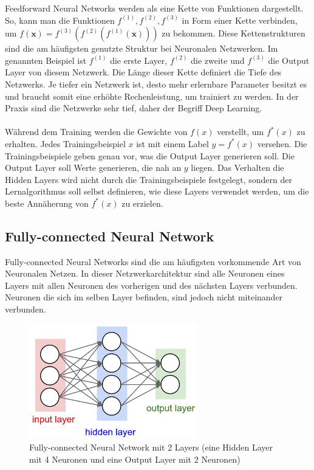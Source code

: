 Feedforward Neural Networks werden als eine Kette von Funktionen dargestellt. So,
kann man die Funktionen $ f^{(1)}, f^{(2)}, f^{(3)} $ in Form einer Kette verbinden, um $ f(\textbf{x}) = f^{(3)}(f^{(2)}(f^{(1)}(\textbf{x}))) $
zu bekommen. Diese Kettenstrukturen sind die am häufigsten genutzte Struktur bei Neuronalen Netzwerken. Im genannten Beispiel ist $ f^{(1)} $ die
erste Layer, $ f^{(2)} $ die zweite und $ f^{(3)} $ die Output Layer von diesem Netzwerk. Die Länge dieser Kette definiert die Tiefe des Netzwerks.
Je tiefer ein Netzwerk ist, desto mehr erlernbare Parameter besitzt es und braucht somit eine erhöhte Rechenleistung, um trainiert zu werden.
In der Praxis sind die Netzwerke sehr tief, daher der Begriff Deep Learning.
\\
\\
Während dem Training werden die Gewichte von $ f(x) $ verstellt, um $ f^*(x) $ zu erhalten. Jedes Trainingsbeispiel $ x $ ist mit einem Label
$ y = f^*(x)$ versehen. Die Trainingsbeispiele geben genau vor, was die Output Layer generieren soll. Die Output Layer soll Werte generieren,
die nah an $ y $ liegen. Das Verhalten die Hidden Layers wird nicht durch die Trainingsbeispiele festgelegt, sondern der Lernalgorithmus
soll selbst definieren, wie diese Layers verwendet werden, um die beste Annäherung von $ f^*(x) $ zu erzielen.

\subsection{Fully-connected Neural Network}
Fully-connected Neural Networks sind die am häufigsten vorkommende Art von Neuronalen Netzen. In dieser Netzwerkarchitektur sind alle Neuronen
eines Layers mit allen Neuronen des vorherigen und des nächsten Layers verbunden. Neuronen die sich im selben Layer befinden, 
sind jedoch nicht miteinander verbunden.
\cite{cs231-neural-networks}

\begin{figure}[H]
  \centering
  \includegraphics[width=0.65\textwidth]{resources/nn/neural_net.jpeg}
  \caption{
    Fully-connected Neural Network mit 2 Layers (eine Hidden Layer mit 4 Neuronen und eine Output Layer mit 2 Neuronen)
    \cite{fully-connected-neural-network}
  }
  \label{image:neuronal-network}
\end{figure}

